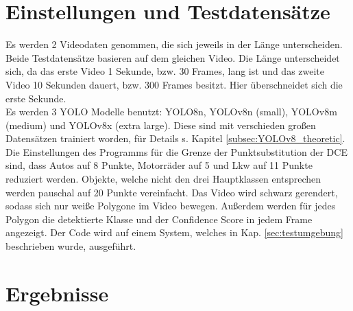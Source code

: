 \section{Einstellungen und Testdatensätze}
{%
	Es werden 2 Videodaten genommen, die sich jeweils in der Länge unterscheiden. Beide Testdatensätze basieren auf dem gleichen Video. Die Länge unterscheidet sich, da das erste Video 1 Sekunde, bzw. 30 Frames, lang ist und das zweite Video 10 Sekunden dauert, bzw. 300 Frames besitzt. Hier überschneidet sich die erste Sekunde. \\
	Es werden 3 YOLO Modelle benutzt: YOLO8n, YOLOv8n (small), YOLOv8m (medium) und YOLOv8x (extra large). Diese sind mit verschieden großen Datensätzen trainiert worden, für Details s. Kapitel \ref{subsec:YOLOv8_theoretic}.
	Die Einstellungen des Programms für die Grenze der Punktsubstitution der DCE sind, dass Autos auf 8 Punkte, Motorräder auf 5 und Lkw auf 11 Punkte reduziert werden.
	Objekte, welche nicht den drei Hauptklassen entsprechen werden pauschal auf 20 Punkte vereinfacht. Das Video wird  schwarz gerendert, sodass sich nur weiße Polygone im Video bewegen. Außerdem werden für jedes Polygon die detektierte Klasse und der Confidence Score in jedem Frame angezeigt.
	Der Code wird auf einem System, welches in Kap. \ref{sec:testumgebung} beschrieben wurde, ausgeführt.

}
\section{Ergebnisse\label{sec:Ergebnisse}}  

